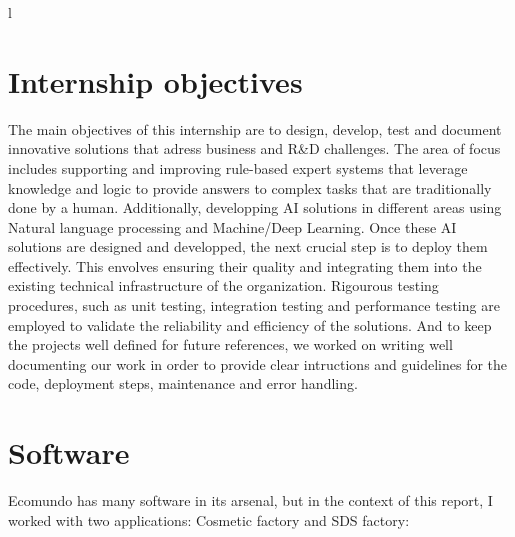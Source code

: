 l\documentclass[a4paper,12pt,twoside]{report}
\begin{document}
\section{Internship objectives}
The main objectives of this internship are to design, develop, test and document innovative solutions that adress business and R\&D challenges. The area of focus includes supporting and improving rule-based expert systems that leverage knowledge and logic to provide answers to complex tasks that are traditionally done by a human. Additionally, developping AI solutions in different areas using Natural language processing and Machine/Deep Learning. Once these AI solutions are designed and developped, the next crucial step is to deploy them effectively. This envolves ensuring their quality and integrating them into the existing technical infrastructure of the organization. Rigourous testing procedures, such as unit testing, integration testing and performance testing are employed to validate the reliability and efficiency of the solutions. And to keep the projects well defined for future references, we worked on writing well documenting our work in order to provide clear intructions and guidelines for the code, deployment steps, maintenance and error handling.

\section{Software}
Ecomundo has many software in its arsenal, but in the context of this report, I worked with two applications: Cosmetic factory and SDS factory:
\end{document}
